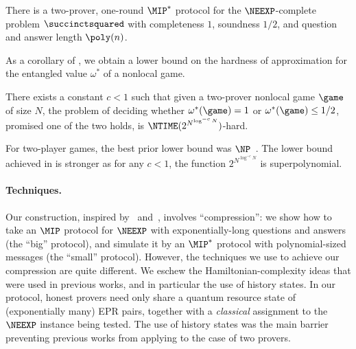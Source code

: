 \begin{theorem}
  \label{thm:main-informal}
  There is a two-prover, one-round $\MIP^*$ protocol for the $\NEEXP$-complete
  problem $\succinctsquared$ with completeness $1$, soundness $1/2$, and
  question and answer length $\poly(n)$.
\end{theorem}

As a corollary of , we obtain a lower bound on the hardness
of approximation for the entangled value $\omega^*$ of a nonlocal game.
\begin{corollary}\label{cor:main-games-informal}
  There exists a constant $c < 1$ such that given a two-prover
  nonlocal game $\game$ of size $N$, the problem of deciding
  whether $\omega^*(\game) = 1$ or $\omega^*(\game) \leq 1/2$,
  promised one of the two holds, is $\NTIME(2^{N^{\log^{-c} N}})$-hard.
\end{corollary}
For two-player games, the best prior lower bound was
$\NP$~\cite{NV18b}. The lower bound achieved in
 is
stronger as for any $c < 1$, the function $2^{N^{\log^{-c} N}}$ is
superpolynomial.

\paragraph{Techniques.}

Our construction, inspired by~\cite{Ji17}
and~\cite{FJVY19}, involves ``compression'': we show how to take an $\MIP$ protocol for $\NEEXP$
with exponentially-long questions and answers (the ``big'' protocol),
and simulate it by an $\MIP^*$ protocol with polynomial-sized messages (the ``small''
protocol). However, the techniques we use to achieve our compression
are quite different. We
eschew the Hamiltonian-complexity ideas that were used in previous
works, and in particular the use of history states. In our protocol,
honest provers need only share a quantum resource state of (exponentially
many) EPR pairs, together with a \emph{classical} assignment to the
$\NEEXP$ instance being tested. The use of history states was the main
barrier preventing previous works from applying to the case of
two provers. 

